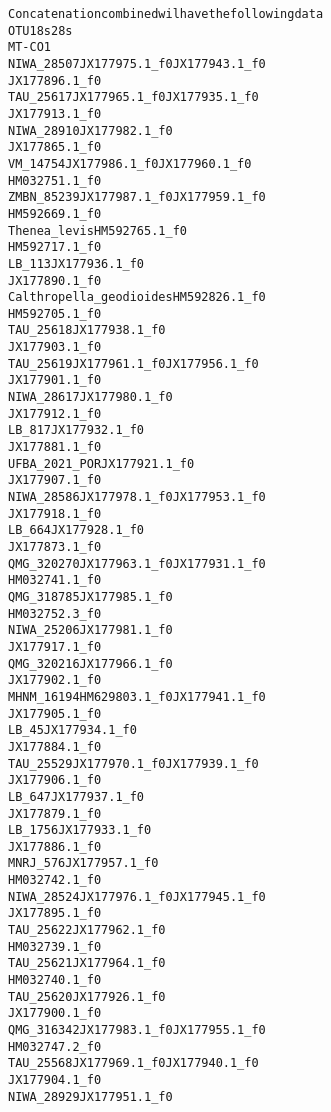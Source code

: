 \documentclass[letterpaper,10pt,english]{/usr/share/sphinx/texinputs/sphinxhowto}
\newenvironment{InvisibleVerbatim}
        {\begin{mdframed}[leftmargin=0.1\linewidth,innerleftmargin=3pt,innerrightmargin=3pt, userdefinedwidth=1\linewidth, linewidth=0pt, linecolor=white, usetwoside=false]}
        {\end{mdframed}}
\begin{document}
                \begin{InvisibleVerbatim}
                \vspace{-0.5\baselineskip}
\begin{alltt}Concatenation combined wil have the following data
OTU                           18s                 28s
MT-CO1
NIWA\_28507                    JX177975.1\_f0  JX177943.1\_f0
JX177896.1\_f0
TAU\_25617                     JX177965.1\_f0  JX177935.1\_f0
JX177913.1\_f0
NIWA\_28910                    JX177982.1\_f0
JX177865.1\_f0
VM\_14754                      JX177986.1\_f0  JX177960.1\_f0
HM032751.1\_f0
ZMBN\_85239                    JX177987.1\_f0  JX177959.1\_f0
HM592669.1\_f0
Thenea\_levis                                 HM592765.1\_f0
HM592717.1\_f0
LB\_113                                       JX177936.1\_f0
JX177890.1\_f0
Calthropella\_geodioides                      HM592826.1\_f0
HM592705.1\_f0
TAU\_25618                                    JX177938.1\_f0
JX177903.1\_f0
TAU\_25619                     JX177961.1\_f0  JX177956.1\_f0
JX177901.1\_f0
NIWA\_28617                    JX177980.1\_f0
JX177912.1\_f0
LB\_817                                       JX177932.1\_f0
JX177881.1\_f0
UFBA\_2021\_POR                                JX177921.1\_f0
JX177907.1\_f0
NIWA\_28586                    JX177978.1\_f0  JX177953.1\_f0
JX177918.1\_f0
LB\_664                                       JX177928.1\_f0
JX177873.1\_f0
QMG\_320270                    JX177963.1\_f0  JX177931.1\_f0
HM032741.1\_f0
QMG\_318785                    JX177985.1\_f0
HM032752.3\_f0
NIWA\_25206                    JX177981.1\_f0
JX177917.1\_f0
QMG\_320216                    JX177966.1\_f0
JX177902.1\_f0
MHNM\_16194                    HM629803.1\_f0  JX177941.1\_f0
JX177905.1\_f0
LB\_45                                        JX177934.1\_f0
JX177884.1\_f0
TAU\_25529                     JX177970.1\_f0  JX177939.1\_f0
JX177906.1\_f0
LB\_647                                       JX177937.1\_f0
JX177879.1\_f0
LB\_1756                                      JX177933.1\_f0
JX177886.1\_f0
MNRJ\_576                                     JX177957.1\_f0
HM032742.1\_f0
NIWA\_28524                    JX177976.1\_f0  JX177945.1\_f0
JX177895.1\_f0
TAU\_25622                     JX177962.1\_f0
HM032739.1\_f0
TAU\_25621                     JX177964.1\_f0
HM032740.1\_f0
TAU\_25620                                    JX177926.1\_f0
JX177900.1\_f0
QMG\_316342                    JX177983.1\_f0  JX177955.1\_f0
HM032747.2\_f0
TAU\_25568                     JX177969.1\_f0  JX177940.1\_f0
JX177904.1\_f0
NIWA\_28929                                   JX177951.1\_f0

\end{alltt}
\end{InvisibleVerbatim}
\end{document}
